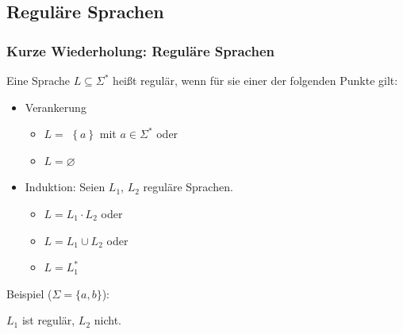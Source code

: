 \subsection{Reguläre Sprachen}
\begin{frame}
 \frametitle{Kurze Wiederholung: Reguläre Sprachen}

        Eine Sprache \(L\subseteq\Sigma^*\) heißt regulär, wenn für sie einer der folgenden Punkte gilt:

\begin{itemize}
\item Verankerung
      \begin{itemize}
      \item \(L = \) $\left\{ a\right \}$ mit \(a\in\Sigma^*\) oder
      \item \(L = \varnothing \)
      \end{itemize}
\item Induktion: Seien \(L_1\), \(L_2\) reguläre Sprachen.
      \begin{itemize}
      \item \(L = L_1 \cdot L_2\) oder
      \item \(L = L_1 \cup L_2\) oder
      \item \(L = L_1^*\)
      \end{itemize}
\end{itemize}

Beispiel ($\Sigma = \{a,b\}$):

	
	$L_1$ ist regulär, $L_2$ nicht.
\end{frame}

